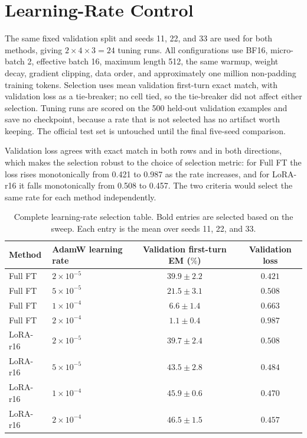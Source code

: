\documentclass[10pt]{article}
\begin{document}
\appendix
\newpage
\section{Learning-Rate Control}\label{app:lr}

The same fixed validation split and seeds 11, 22, and 33 are used for both methods, giving $2\times4\times3=24$ tuning runs. All configurations use BF16, micro-batch 2, effective batch 16, maximum length 512, the same warmup, weight decay, gradient clipping, data order, and approximately one million non-padding training tokens. Selection uses mean validation first-turn exact match, with validation loss as a tie-breaker; no cell tied, so the tie-breaker did not affect either selection. Tuning runs are scored on the 500 held-out validation examples and save no checkpoint, because a rate that is not selected has no artifact worth keeping. The official test set is untouched until the final five-seed comparison.

Validation loss agrees with exact match in both rows and in both directions, which makes the selection robust to the choice of selection metric: for Full FT the loss rises monotonically from 0.421 to 0.987 as the rate increases, and for LoRA-r16 it falls monotonically from 0.508 to 0.457. The two criteria would select the same rate for each method independently.

\begin{table}[H]
\centering
\caption{Complete learning-rate selection table. Bold entries are selected based on the sweep. Each entry is the mean over seeds 11, 22, and 33.}
\begin{tabular}{llcc}
\toprule
Method & AdamW learning rate & Validation first-turn EM ($\%$) & Validation loss \\
\midrule
Full FT & $2\times10^{-5}$ & $\mathbf{39.9 \pm 2.2}$ & $\mathbf{0.421}$ \\
Full FT & $5\times10^{-5}$ & $21.5 \pm 3.1$ & $0.508$ \\
Full FT & $1\times10^{-4}$ & $6.6 \pm 1.4$ & $0.663$ \\
Full FT & $2\times10^{-4}$ & $1.1 \pm 0.4$ & $0.987$ \\
\midrule
LoRA-r16 & $2\times10^{-5}$ & $39.7 \pm 2.4$ & $0.508$ \\
LoRA-r16 & $5\times10^{-5}$ & $43.5 \pm 2.8$ & $0.484$ \\
LoRA-r16 & $1\times10^{-4}$ & $45.9 \pm 0.6$ & $0.470$ \\
LoRA-r16 & $2\times10^{-4}$ & $\mathbf{46.5 \pm 1.5}$ & $\mathbf{0.457}$ \\
\bottomrule
\end{tabular}
\end{table}
\end{document}
